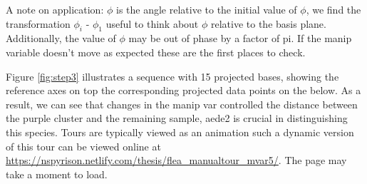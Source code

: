 A note on application: \(\phi\) is the angle relative to the initial
value of \(\phi\), we find the transformation \(\phi_i\) - \(\phi_1\)
useful to think about \(\phi\) relative to the basis plane.
Additionally, the value of \(\phi\) may be out of phase by a factor of
pi. If the manip variable doesn't move as expected these are the first
places to check.

Figure \ref{fig:step3} illustrates a sequence with 15 projected bases,
showing the reference axes on top the corresponding projected data
points on the below. As a result, we can see that changes in the manip
var controlled the distance between the purple cluster and the remaining
sample, aede2 is crucial in distinguishing this species. Tours are
typically viewed as an animation such a dynamic version of this tour can
be viewed online at
\url{https://nspyrison.netlify.com/thesis/flea_manualtour_mvar5/}. The
page may take a moment to load.

